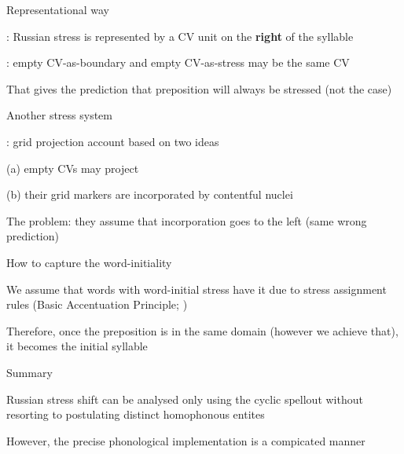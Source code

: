 \documentclass{beamer}
\begin{document}
	\begin{frame}{Representational way}

		\textcite{Enguehard:2016}: Russian stress is represented by a CV unit on the \textbf{right} of the syllable

		\textcite{Enguehard:2014}: empty CV-as-boundary and empty CV-as-stress may be the same CV
		
 		That gives the prediction that preposition will always be stressed (not the case)

	\end{frame}

	\begin{frame}{Another stress system}

		\textcite{Faust:2018}: grid projection account based on two ideas

		(a) empty CVs may project

		(b) their grid markers are incorporated by contentful nuclei

		The problem: they assume that incorporation goes to the left (same wrong prediction)

	\end{frame}

	\begin{frame}{How to capture the word-initiality}

		We assume that words with word-initial stress have it due to stress assignment rules (Basic Accentuation Principle; \cite{Melvold:1989})

	Therefore, once the preposition is in the same domain (however we achieve that), it becomes the initial syllable

	\end{frame}

	\begin{frame}{Summary}

		Russian stress shift can be analysed only using the cyclic spellout without resorting to postulating distinct homophonous entites

		However, the precise phonological implementation is a compicated manner

	\end{frame}
	
\end{document}
